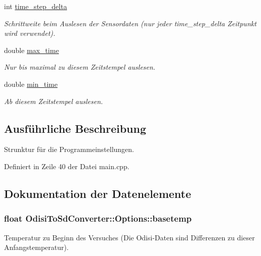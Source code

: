 \begin{DoxyCompactItemize}
int \hyperlink{structOdisiToSdConverter_1_1Options_a2e5c6038a0ff5ca7d32be89740b82aa4}{time\-\_\-step\-\_\-delta}
\begin{DoxyCompactList}\small\item\em Schrittweite beim Auslesen der Sensordaten (nur jeder time\-\_\-step\-\_\-delta Zeitpunkt wird verwendet). \end{DoxyCompactList}\item 
double \hyperlink{structOdisiToSdConverter_1_1Options_afb526c278f5e4273379c0e6345ce01c0}{max\-\_\-time}
\begin{DoxyCompactList}\small\item\em Nur bis maximal zu diesem Zeitstempel auslesen. \end{DoxyCompactList}\item 
double \hyperlink{structOdisiToSdConverter_1_1Options_a2c97daa31cfdd315fd1d9a3307665edb}{min\-\_\-time}
\begin{DoxyCompactList}\small\item\em Ab diesem Zeitstempel auslesen. \end{DoxyCompactList}\end{DoxyCompactItemize}


\subsection{Ausführliche Beschreibung}
Strunktur für die Programmeinstellungen. 

Definiert in Zeile 40 der Datei main.\-cpp.



\subsection{Dokumentation der Datenelemente}
\hypertarget{structOdisiToSdConverter_1_1Options_a3bda06d5caa4384aba4bd5302b44cde0}{
\subsubsection[{basetemp}]{\setlength{\rightskip}{0pt plus 5cm}float Odisi\-To\-Sd\-Converter\-::\-Options\-::basetemp}}\label{structOdisiToSdConverter_1_1Options_a3bda06d5caa4384aba4bd5302b44cde0}


Temperatur zu Beginn des Versuches (Die Odisi-\/\-Daten sind Differenzen zu dieser Anfangstemperatur). 



